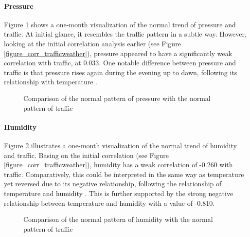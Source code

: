 \paragraph{Pressure}

Figure \ref{figure_traffic_vs_pressure} shows a one-month visualization of the normal trend of pressure and traffic. At initial glance, it resembles the traffic pattern in a subtle way. However, looking at the initial correlation analysis earlier (see Figure \ref{figure_corr_trafficweather}), pressure appeared to have a significantly weak correlation with traffic, at 0.033. One notable difference between pressure and traffic is that pressure rises again during the evening up to dawn, following its relationship with temperature .


\begin{figure}[h]
  \centering
  \captionsetup{justification=centering}
  \caption{Comparison of the normal pattern of pressure with the normal pattern of traffic}
\label{figure_traffic_vs_pressure}
\end{figure}


\paragraph{Humidity}

Figure \ref{figure_traffic_vs_humidity} illustrates a one-month visualization of the normal trend of humidity and traffic. Basing on the initial correlation (see Figure \ref{figure_corr_trafficweather}), humidity has a weak correlation of -0.260 with traffic. Comparatively, this could be interpreted in the same way as temperature yet reversed due to its negative relationship, following the relationship of temperature and humidity . This is further supported by the strong negative relationship between temperature and humidity with a value of -0.810.


\begin{figure}[h]
  \centering
  \captionsetup{justification=centering}
  \caption{Comparison of the normal pattern of humidity with the normal pattern of traffic}
\label{figure_traffic_vs_humidity}
\end{figure}

